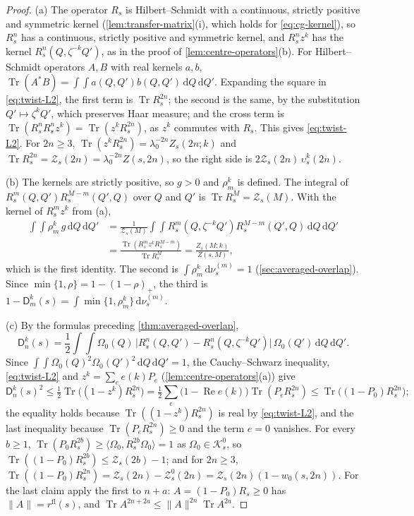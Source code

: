 \documentclass[11pt,a4paper]{amsart}
\theoremstyle{definition}
\theoremstyle{remark}
\numberwithin{equation}{section}
\DeclareMathOperator{\Tr}{Tr}        %
\newcommand{\Kspace}{\mathcal{K}}    %
\newcommand{\ip}[2]{\langle #1,#2\rangle}  %
\newcommand{\norm}[1]{\lVert #1\rVert}     %
\newcommand{\abs}[1]{\lvert #1\rvert}      %
\newcommand{\dd}{\,\mathrm{d}}             %
\newcommand{\TT}{\mathbb{T}}               %
\newcommand{\Zpart}[2]{Z(#1,#2)}           %
\newcommand{\Zc}{\mathcal{Z}}              %
\newcommand{\Zs}[2]{\Zc_{#1}(#2)}          %
\newcommand{\lzero}{\lambda_0}             %
\newcommand{\Omegazero}{\Omega_0}          %
\begin{document}
\begin{proof}
(a) The operator $R_s$ is Hilbert--Schmidt with a continuous, strictly positive and symmetric kernel (\cref{lem:transfer-matrix}\textup{(i)}, which holds for \eqref{eq:cg-kernel}), so $R_s^n$ has a continuous, strictly positive and symmetric kernel, and $R_s^nz^k$ has the kernel $R_s^n(Q,\zeta^{-k}Q')$, as in the proof of \cref{lem:centre-operators}\textup{(b)}. For Hilbert--Schmidt operators $A,B$ with real kernels $a,b$, $\Tr(A^*B)=\int\!\!\int a(Q,Q')b(Q,Q')\dd Q\dd Q'$. Expanding the square in \eqref{eq:twist-L2}, the first term is $\Tr R_s^{2n}$; the second is the same, by the substitution $Q'\mapsto\zeta^kQ'$, which preserves Haar measure; and the cross term is $\Tr(R_s^nR_s^nz^k)=\Tr(z^kR_s^{2n})$, as $z^k$ commutes with $R_s$. This gives \eqref{eq:twist-L2}. For $2n\ge3$, $\Tr(z^kR_s^{2n})=\lzero^{-2n}Z_s(2n;k)$ and $\Tr R_s^{2n}=\Zs{s}{2n}=\lzero^{-2n}\Zpart{s}{2n}$, so the right side is $2\Zs{s}{2n}\,\upsilon^k_s(2n)$.

(b) The kernels are strictly positive, so $g>0$ and $\rho^k_m$ is defined. The integral of $R_s^m(Q,Q')R_s^{M-m}(Q',Q)$ over $Q$ and $Q'$ is $\Tr R_s^M=\Zs{s}{M}$. With the kernel of $R_s^mz^k$ from (a),
\begin{align*}
\int\!\!\int\rho^k_m\,g\dd Q\dd Q'&=\frac1{\Zs{s}{M}}\int\!\!\int R_s^m(Q,\zeta^{-k}Q')R_s^{M-m}(Q',Q)\dd Q\dd Q'\\
&=\frac{\Tr(R_s^mz^kR_s^{M-m})}{\Tr R_s^M}=\frac{Z_s(M;k)}{\Zpart{s}{M}},
\end{align*}
which is the first identity. The second is $\int\rho^k_m\dd\nu^{(m)}_s=1$ (\cref{sec:averaged-overlap}). Since $\min\{1,\rho\}=1-(1-\rho)_+$, the third is $1-\mathsf D^k_m(s)=\int\min\{1,\rho^k_m\}\dd\nu^{(m)}_s$.

(c) By the formulas preceding \cref{thm:averaged-overlap},
\[
\mathsf D^k_n(s)=\frac12\int\!\!\int\Omegazero(Q)\,\abs{R_s^n(Q,Q')-R_s^n(Q,\zeta^{-k}Q')}\,\Omegazero(Q')\dd Q\dd Q'.
\]
Since $\int\!\!\int\Omegazero(Q)^2\Omegazero(Q')^2\dd Q\dd Q'=1$, the Cauchy--Schwarz inequality, \eqref{eq:twist-L2} and $z^k=\sum_ee(k)P_e$ (\cref{lem:centre-operators}\textup{(a)}) give
\[
\mathsf D^k_n(s)^2\le\tfrac12\Tr\bigl((1-z^k)R_s^{2n}\bigr)=\tfrac12\sum_e\bigl(1-\operatorname{Re}e(k)\bigr)\Tr(P_eR_s^{2n})\le\Tr\bigl((1-P_0)R_s^{2n}\bigr);
\]
the equality holds because $\Tr((1-z^k)R_s^{2n})$ is real by \eqref{eq:twist-L2}, and the last inequality because $\Tr(P_eR_s^{2n})\ge0$ and the term $e=0$ vanishes. For every $b\ge1$, $\Tr(P_0R_s^{2b})\ge\ip{\Omegazero}{R_s^{2b}\Omegazero}=1$ as $\Omegazero\in\Kspace^0_s$, so $\Tr((1-P_0)R_s^{2b})\le\Zs{s}{2b}-1$; and for $2n\ge3$, $\Tr((1-P_0)R_s^{2n})=\Zs{s}{2n}-\Zc^0_s(2n)=\Zs{s}{2n}(1-w_0(s,2n))$. For the last claim apply the first to $n+a$: $A=(1-P_0)R_s\ge0$ has $\norm A=r^{\mathrm{fl}}(s)$, and $\Tr A^{2n+2a}\le\norm A^{2n}\Tr A^{2a}$.
\end{proof}
\end{document}
